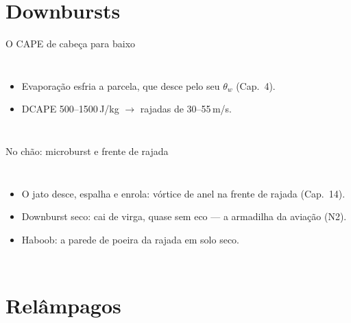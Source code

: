 \documentclass[aspectratio=169,11pt]{beamer}
\begin{document}
\section{Downbursts}

\begin{frame}{O CAPE de cabeça para baixo}
  \begin{columns}
    \vspace{0.4em}
    \begin{itemize}
      \item Evaporação esfria a parcela, que desce pelo seu
            $\theta_w$ (Cap.~4).
      \item DCAPE 500--1500\,J/kg $\to$ rajadas de 30--55\,m/s.
    \end{itemize}
  \end{columns}
\end{frame}

\begin{frame}{No chão: microburst e frente de rajada}
  \begin{columns}
    \begin{itemize}
      \item O jato desce, espalha e enrola: vórtice de anel na frente
            de rajada (Cap.~14).
      \item Downburst \alert{seco}: cai de virga, quase sem eco — a
            armadilha da aviação (N2).
      \item Haboob: a parede de poeira da rajada em solo seco.
    \end{itemize}
  \end{columns}
\end{frame}

\section{Relâmpagos}
\end{document}

